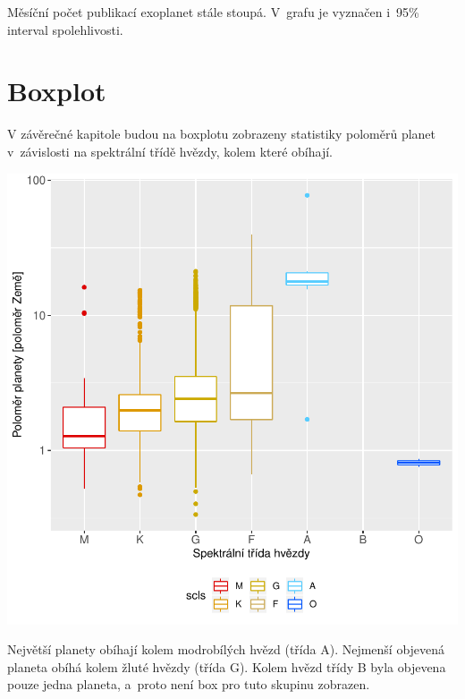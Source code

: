 \documentclass[a4paper,12pt]{article}
\begin{document}
Měsíční počet publikací exoplanet stále stoupá. V~grafu je vyznačen i~95\% interval spolehlivosti.

\newpage

\section{Boxplot}

V závěrečné kapitole budou na boxplotu zobrazeny statistiky poloměrů planet v~závislosti na spektrální třídě hvězdy, kolem které obíhají.

\begin{center}
\includegraphics{exoplanety-032}
\end{center}

Největší planety obíhají kolem modrobílých hvězd (třída A). Nejmenší objevená planeta obíhá kolem žluté hvězdy (třída G). Kolem hvězd třídy B byla objevena pouze jedna planeta, a~proto není box pro tuto skupinu zobrazen.
\end{document}
